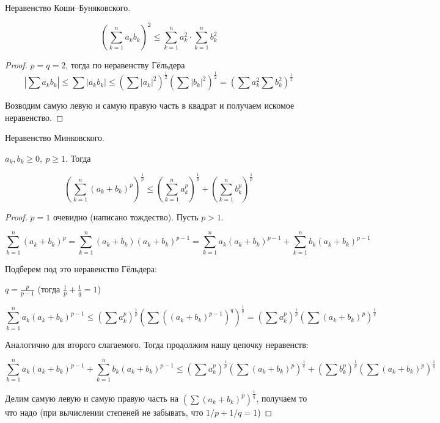 \begin{theorem-non}
    Неравенство Коши–Буняковского.

    \[ (\sum_{k=1}^{n} a_k b_k)^2 \leqslant \sum_{k=1}^{n} a_k^2 \cdot \sum_{k=1}^{n}b_k^2 \]
\end{theorem-non}

\begin{proof}
    $p = q = 2$, тогда по неравенству Гёльдера
    \[ |\sum a_kb_k| \leqslant \sum|a_kb_k| \leqslant \left(\sum|a_k|^2\right)^\frac{1}{2} \left(\sum|b_k|^2\right)^\frac{1}{2} =
    \left(\sum a_k^2 \sum b_k^2\right)^\frac{1}{2}\]

    Возводим самую левую и самую правую часть в квадрат и получаем искомое неравенство.
\end{proof} 

\begin{theorem-non}
    Неравенство Минковского.

    $a_k, b_k \geqslant 0,\ p \geqslant 1$. Тогда

    \[ \left(\sum_{k=1}^{n}(a_k+b_k)^p\right)^\frac{1}{p} \leqslant \left(\sum_{k=1}^{n} a_k^p\right)^\frac{1}{p} +
    \left(\sum_{k=1}^{n} b_k^p\right)^\frac{1}{p} \]
\end{theorem-non}

\begin{proof}
    $p = 1$ очевидно (написано тождество). Пусть $p > 1$.

    \[ \sum_{k=1}^{n}(a_k+b_k)^p = \sum_{k=1}^{n}(a_k+b_k)(a_k+b_k)^{p-1} =
    \sum_{k=1}^{n} a_k(a_k+b_k)^{p-1} + \sum_{k=1}^{n} b_k(a_k+b_k)^{p-1} \]

    Подберем под это неравенство Гёльдера:

    $q = \frac{p}{p-1}$ (тогда $\frac{1}{p} + \frac{1}{q} = 1$)

    \[ \sum_{k=1}^{n} a_k(a_k+b_k)^{p-1} \leqslant \left( \sum a_k^p \right)^\frac{1}{p} \left( \sum ((a_k+b_k)^{p-1})^q \right)^\frac{1}{q}
    = \left( \sum a_k^p \right)^\frac{1}{p} \left( \sum (a_k+b_k)^p \right)^\frac{1}{q} \] 

    Аналогично для второго слагаемого. Тогда продолжим нашу цепочку неравенств:

    \[ \sum_{k=1}^{n} a_k(a_k+b_k)^{p-1} + \sum_{k=1}^{n} b_k(a_k+b_k)^{p-1} \leqslant
    \left( \sum a_k^p \right)^\frac{1}{p} \left( \sum (a_k+b_k)^p \right)^\frac{1}{q} + \left( \sum b_k^p \right)^\frac{1}{p} \left( \sum (a_k+b_k)^p \right)^\frac{1}{q} \]

    Делим самую левую и самую правую часть на $\left( \sum (a_k+b_k)^p \right)^\frac{1}{q}$, 
    получаем то что надо (при вычислении степеней не забывать, что $1/p + 1/q = 1$)


\end{proof}

